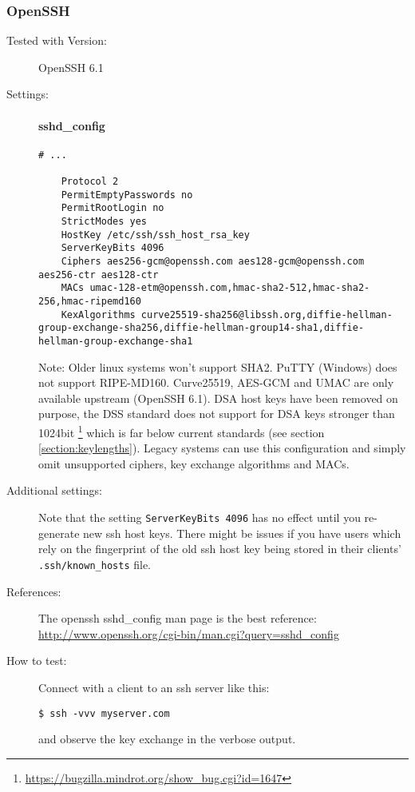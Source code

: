 \subsubsection{OpenSSH}


\begin{description}
\item[Tested with Version:] OpenSSH 6.1

\item[Settings:] \mbox{}


\paragraph*{sshd_config}
\begin{lstlisting}[breaklines]
	# ...

	Protocol 2
	PermitEmptyPasswords no
	PermitRootLogin no
	StrictModes yes
	HostKey /etc/ssh/ssh_host_rsa_key
	ServerKeyBits 4096
	Ciphers aes256-gcm@openssh.com aes128-gcm@openssh.com aes256-ctr aes128-ctr
	MACs umac-128-etm@openssh.com,hmac-sha2-512,hmac-sha2-256,hmac-ripemd160
	KexAlgorithms curve25519-sha256@libssh.org,diffie-hellman-group-exchange-sha256,diffie-hellman-group14-sha1,diffie-hellman-group-exchange-sha1
\end{lstlisting}


Note: Older linux systems won't support SHA2. PuTTY (Windows) does not support
RIPE-MD160. Curve25519, AES-GCM and UMAC are only available upstream (OpenSSH
6.1). DSA host keys have been removed on purpose, the DSS standard does not
support for DSA keys stronger than 1024bit
\footnote{\url{https://bugzilla.mindrot.org/show_bug.cgi?id=1647}} which is far
below current standards (see section \ref{section:keylengths}). Legacy systems
can use this configuration and simply omit unsupported ciphers, key exchange
algorithms and MACs.  

\item[Additional settings:] \mbox{}

Note that the setting \texttt{ServerKeyBits 4096}  has no effect until you re-generate new ssh host keys. There might be issues if you have users which rely on the fingerprint of the old ssh host key being stored in their clients' \texttt{.ssh/known\_hosts} file.

\item[References:] The openssh sshd\_config  man page is the best reference: \url{http://www.openssh.org/cgi-bin/man.cgi?query=sshd_config}


\item[How to test:]

Connect with a client to an ssh server like this: \\
\begin{lstlisting}[breaklines]
$ ssh -vvv myserver.com
\end{lstlisting}
and observe the key exchange in the verbose output.

\end{description}
